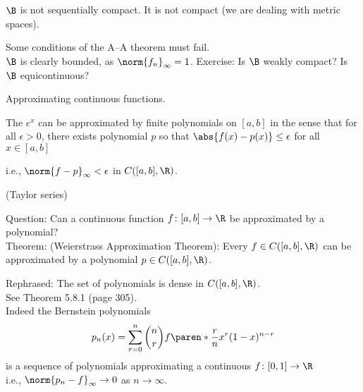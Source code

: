 $\B$ is not sequentially compact.  It is not compact (we are dealing with metric spaces).

Some conditions of the A--A theorem must fail. \\
$\B$ is clearly bounded, as $\norm{f_n}_\infty=1$.  Exercise: Is $\B$ weakly compact?  Is $\B$ equicontinuous?

Approximating continuous functions.

The $e^x$ can be approximated by finite polynomials on $[a,b]$ in the sense that for all $\epsilon>0$, there exists polynomial $p$ so that $\abs{f(x)-p(x)}\leq\epsilon$ for all $x\in[a,b]$
\begin{center}i.e., $\norm{f-p}_\infty<\epsilon$ in $C([a,b],\R)$.\end{center}
(Taylor series)

Question: Can a continuous function $f\colon[a,b]\to\R$ be approximated by a polynomial? \\
Theorem: (Weierstrass Approximation Theorem): Every $f\in C([a,b],\R)$ can be approximated by a polynomial $p\in C([a,b],\R)$.

Rephrased: The set of polynomials is dense in $C([a,b],\R)$. \\
See Theorem 5.8.1 (page 305). \\
Indeed the Bernstein polynomials
\[ p_n(x) = \sum_{r=0}^n \binom{n}{r} f\paren*{\frac{r}{n}} x^r (1-x)^{n-r} \]
is a sequence of polynomials approximating a continuous $f\colon[0,1]\to\R$ \\
i.e., $\norm{p_n-f}_\infty\to0$ as $n\to\infty$.
